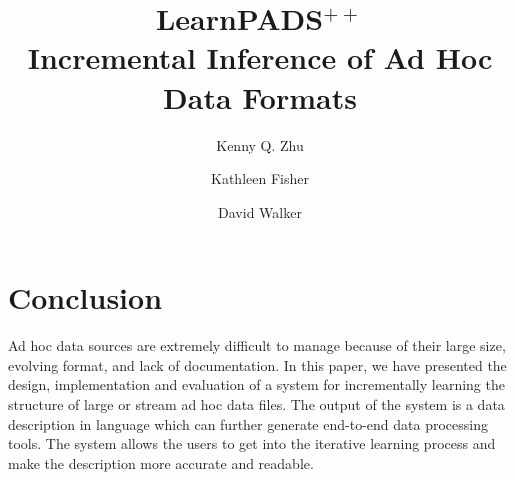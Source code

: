 \documentclass{llncs}
\begin{document}
%
\title{{\sc LearnPADS}$^{++}$ \\ Incremental Inference of Ad Hoc Data Formats}
\author{Kenny Q. Zhu \and Kathleen Fisher \and 
David Walker} 

\maketitle





%









\section{Conclusion}
\label{sec:conclude}
Ad hoc data sources
are extremely difficult to manage because of their large size,
evolving format, and lack of documentation.
In this paper, we have presented the design, implementation and
evaluation of a system for incrementally learning the structure of 
large or stream ad hoc data files. The output of the
system is a data description in \pads{} language which can further
generate end-to-end data processing tools. 
The system allows the users to get into the iterative learning process
and make the description more accurate and readable.


{\renewcommand{\baselinestretch}{0.9}
\small


}
\end{document}
